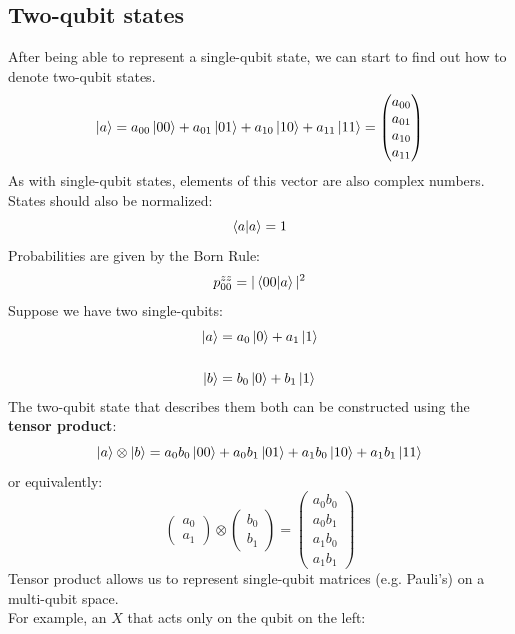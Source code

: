 \documentclass[hidelinks, a4paper, 12pt]{article}
\newcommand{\bd}{\textbf}
\newcommand{\n}{\\[\baselineskip]}
\begin{document}
        \subsection{Two-qubit states}
            After being able to represent a single-qubit state, we can start to find out how to denote two-qubit states.
            \[\ket{a} = a_{00}\ket{00} + a_{01}\ket{01} + a_{10}\ket{10} + a_{11}\ket{11} = \begin{pmatrix} a_{00} \\ a_{01} \\ a_{10} \\ a_{11}\end{pmatrix}\]
            As with single-qubit states, elements of this vector are also complex numbers.\n
            States should also be normalized:
            \[\braket{a|a} = 1\]
            Probabilities are given by the Born Rule:
            \[p_{00}^{zz} = |\braket{00|a}|^2\]
            Suppose we have two single-qubits:
            \[\begin{split}
                \ket{a} &= a_0\ket{0} + a_1\ket{1}\n
                \ket{b} &= b_0\ket{0} + b_1\ket{1}
            \end{split}\]
            The two-qubit state that describes them both can be constructed using the \bd{tensor product}:
            \[\ket{a} \otimes \ket{b} = a_0b_0\ket{00} + a_0b_1\ket{01} + a_1b_0\ket{10} + a_1b_1\ket{11}\]
            or equivalently:
            \[\begin{pmatrix} a_0 \\ a_1 \end{pmatrix} \otimes \begin{pmatrix} b_0 \\ b_1 \end{pmatrix} = \begin{pmatrix} a_0b_0 \\ a_0b_1 \\ a_1b_0 \\ a_1b_1 \end{pmatrix}\]
            Tensor product allows us to represent single-qubit matrices (e.g. Pauli's) on a multi-qubit space.\n
            For example, an $X$ that acts only on the qubit on the left:
\end{document}
